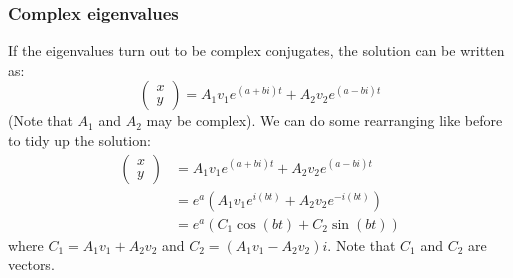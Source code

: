\documentclass{scrartcl}
\begin{document}
\subsubsection{Complex eigenvalues}
If the eigenvalues turn out to be complex conjugates, the solution can be written as:
\begin{equation}
\begin{pmatrix}
x \\
y
\end{pmatrix}
= A_{1}v_{1}e^{(a + bi)t} + A_{2}v_{2}e^{(a - bi)t}
\end{equation}
(Note that $ A_{1} $ and $ A_{2} $ may be complex). We can do some rearranging like before to tidy up the solution:
\begin{equation}
\begin{split}
\begin{pmatrix}
x \\
y
\end{pmatrix}
& = A_{1}v_{1}e^{(a + bi)t} + A_{2}v_{2}e^{(a - bi)t} \\
& = e^{a}(A_{1}v_{1}e^{i(bt)} + A_{2}v_{2}e^{- i(bt)}) \\
& = e^{a}(C_{1}\cos(bt) + C_{2}\sin(bt))
\end{split}
\end{equation}
where $ C_{1} = A_{1}v_{1} + A_{2}v_{2} $ and $ C_{2} = (A_{1}v_{1} - A_{2}v_{2})i $. Note that $ C_{1} $ and $ C_{2} $ are vectors.
\end{document}
